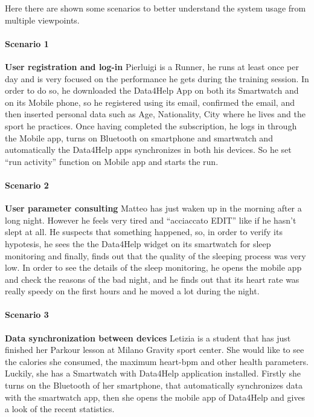 Here there are shown some scenarios to better understand the system usage from multiple viewpoints.

\paragraph{Scenario 1} \textbf{ User registration and log-in} \newline
Pierluigi is a Runner, he runs at least once per day and is very focused on the performance he gets during the training session.
In order to do so, he downloaded the Data4Help App on both its Smartwatch and on its Mobile phone, so he registered using its email, confirmed the email, and then inserted personal data such as Age, Nationality, City where he lives and the sport he practices.
Once having completed the subscription, he logs in through the Mobile app, turns on Bluetooth on smartphone and smartwatch and automatically the Data4Help apps synchronizes in both his devices. So he set “run activity” function on Mobile app and starts the run.



\paragraph{Scenario 2} \textbf{ User parameter consulting} \newline
Matteo has just waken up in the morning after a long night. However he feels very tired and “acciaccato EDIT” like if he hasn’t slept at all. He suspects that something happened, so, in order to verify its hypotesis, he sees the the Data4Help widget on its smartwatch for sleep monitoring and finally, finds out that the quality of the sleeping process was very low.
In order to see the details of the sleep monitoring, he opens the mobile app and check the reasons of the bad night, and he finds out that its heart rate was really speedy on the first hours and he moved a lot during the night.



\paragraph{Scenario 3} \textbf{Data synchronization between devices} \newline
Letizia is a student that has just finished her Parkour lesson at Milano Gravity sport center.
She would like to see the calories she consumed, the maximum heart-bpm and other health parameters. Luckily, she has a Smartwatch with Data4Help application installed. Firstly she turns on the Bluetooth of her smartphone, that automatically synchronizes data with the smartwatch app, then she opens the mobile app of Data4Help and gives a look of the recent statistics.



